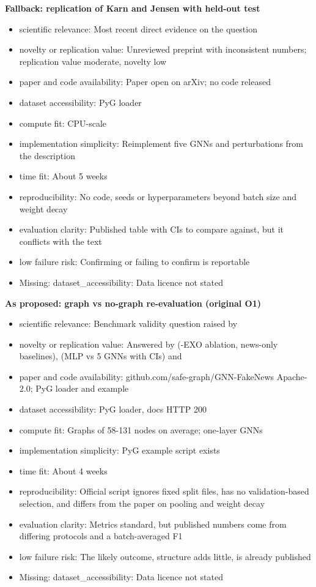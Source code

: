 \documentclass[11pt,a4paper]{article}
\begin{document}
\textbf{Fallback: replication of Karn and Jensen with held-out test}
\begin{itemize}
\item scientific relevance: Most recent direct evidence on the question \cite{karn2025structure}
\item novelty or replication value: Unreviewed preprint with inconsistent numbers; replication value moderate, novelty low
\item paper and code availability: Paper open on arXiv; no code released
\item dataset accessibility: PyG loader
\item compute fit: CPU-scale
\item implementation simplicity: Reimplement five GNNs and perturbations from the description
\item time fit: About 5 weeks
\item reproducibility: No code, seeds or hyperparameters beyond batch size and weight decay
\item evaluation clarity: Published table with CIs to compare against, but it conflicts with the text
\item low failure risk: Confirming or failing to confirm is reportable
\item Missing: dataset\_accessibility: Data licence not stated
\end{itemize}

\textbf{As proposed: graph vs no-graph re-evaluation (original O1)}
\begin{itemize}
\item scientific relevance: Benchmark validity question raised by \cite{karn2025structure,tuan2026review}
\item novelty or replication value: Answered by \cite{dou2021upfd} (-EXO ablation, news-only baselines), \cite{karn2025structure} (MLP vs 5 GNNs with CIs) and \cite{kim2025dawn}
\item paper and code availability: github.com/safe-graph/GNN-FakeNews Apache-2.0; PyG loader and example
\item dataset accessibility: PyG loader, docs HTTP 200
\item compute fit: Graphs of 58-131 nodes on average; one-layer GNNs
\item implementation simplicity: PyG example script exists
\item time fit: About 4 weeks
\item reproducibility: Official script ignores fixed split files, has no validation-based selection, and differs from the paper on pooling and weight decay
\item evaluation clarity: Metrics standard, but published numbers come from differing protocols and a batch-averaged F1
\item low failure risk: The likely outcome, structure adds little, is already published
\item Missing: dataset\_accessibility: Data licence not stated
\end{itemize}
\end{document}
